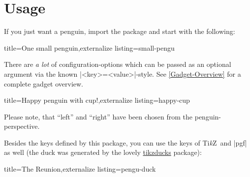 \documentclass[parskip=half,english,numbers=noenddot,footnotes=nomultiple,oneside]{scrartcl}
\let\say\enquote
\def\TikZ{Ti\textit{k}Z}
\begin{document}
\vfill
\section{Usage}\label{Usage}

If you just want a penguin, import the package and start with the following:
\begin{tcblisting}{title={One small penguin},externalize listing=small-pengu}
\begin{tikzpicture}
	\pingu
\end{tikzpicture}
\end{tcblisting}

There are \textit{a lot} of configuration-options which can be passed as an optional argument via the known |<key>=<value>|-style. See \autoref{Gadget-Overview} for a complete gadget overview.
\begin{tcblisting}{title={Happy penguin with cup!},externalize listing=happy-cup}
\end{tcblisting}
Please note, that \say{left} and \say{right} have been chosen from the penguin-perspective.

\clearpage Besides the keys defined by this package, you can use the keys of \TikZ\ and |pgf| as well (the duck was generated by the lovely \href{https://github.com/samcarter/tikzducks}{tikzducks} package):
\begin{tcblisting}{title={The Reunion},externalize listing=pengu-duck}
\begin{tikzpicture}
	\duck
	\pingu[xshift=2.8cm, yshift=14mm,
	       eyes wink]
\end{tikzpicture}
\end{tcblisting}
\end{document}
